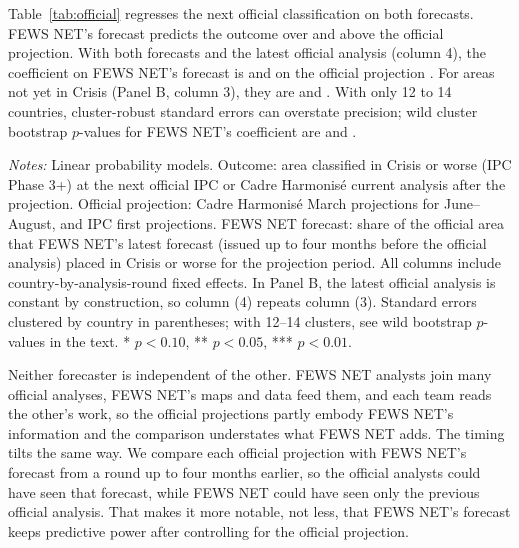 \documentclass[11pt]{article}
\begin{document}
Table~\ref{tab:official} regresses the next official classification on both forecasts. FEWS NET's forecast predicts the outcome over and above the official projection. With both forecasts and the latest official analysis (column 4), the coefficient on FEWS NET's forecast is \offCoefAllFews{} and on the official projection \offCoefAllProj{}. For areas not yet in Crisis (Panel B, column 3), they are \offCoefNewFews{} and \offCoefNewProj{}. With only 12 to 14 countries, cluster-robust standard errors can overstate precision; wild cluster bootstrap $p$-values for FEWS NET's coefficient are \bootOffAllFews{} and \bootOffNewFews{}.

\begin{table}[t]
\centering

\caption{FEWS NET's forecasts and the official projections, scored against the next official analysis}\label{tab:official}
\scriptsize
\resizebox{\textwidth}{!}{}
\par\vspace{4pt}\begin{minipage}{\textwidth}\scriptsize \textit{Notes:} Linear probability models. Outcome: area classified in Crisis or worse (IPC Phase 3+) at the next official IPC or Cadre Harmonis\'e current analysis after the projection. Official projection: Cadre Harmonis\'e March projections for June--August, and IPC first projections. FEWS NET forecast: share of the official area that FEWS NET's latest forecast (issued up to four months before the official analysis) placed in Crisis or worse for the projection period. All columns include country-by-analysis-round fixed effects. In Panel B, the latest official analysis is constant by construction, so column (4) repeats column (3). Standard errors clustered by country in parentheses; with 12--14 clusters, see wild bootstrap $p$-values in the text. * $p<0.10$, ** $p<0.05$, *** $p<0.01$.
\end{minipage}

\end{table}

Neither forecaster is independent of the other. FEWS NET analysts join many official analyses, FEWS NET's maps and data feed them, and each team reads the other's work, so the official projections partly embody FEWS NET's information and the comparison understates what FEWS NET adds. The timing tilts the same way. We compare each official projection with FEWS NET's forecast from a round up to four months earlier, so the official analysts could have seen that forecast, while FEWS NET could have seen only the previous official analysis. That makes it more notable, not less, that FEWS NET's forecast keeps predictive power after controlling for the official projection.
\end{document}
